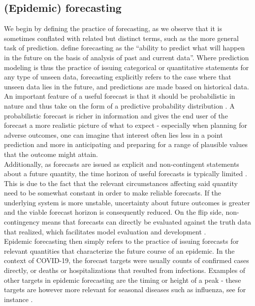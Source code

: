 \subsection{(Epidemic) forecasting} \label{sub:ep_forecasting}
We begin by defining the practice of forecasting, as we observe that it is sometimes conflated with related but distinct terms, such as the more general task of prediction. \cite{moran_epidemic_2016} define forecasting as the ``ability to predict what will happen in the future on the basis of analysis of past and current data''. Where prediction modeling is thus the practice of issuing categorical or quantitative statements for any type of unseen data, forecasting explicitly refers to the case where that unseen data lies in the future, and predictions are made based on historical data.\\
An important feature of a useful forecast is that it should be probabilistic in nature and thus take on the form of a predictive probability distribution \citep{gneiting_probabilistic_2007}. A probabilistic forecast is richer in information and gives the end user of the forecast a more realistic picture of what to expect - especially when planning for adverse outcomes, one can imagine that interest often lies less in a point prediction and more in anticipating and preparing for a range of plausible values that the outcome might attain.\\
Additionally, as forecasts are issued as explicit and non-contingent statements about a future quantity, the time horizon of useful forecasts is typically limited \citep{reich_collaborative_2022}. This is due to the fact that the relevant circumstances affecting said quantity need to be somewhat constant in order to make reliable forecasts. If the underlying system is more unstable, uncertainty about future outcomes is greater and the viable forecast horizon is consequently reduced. On the flip side, non-contingency means that forecasts can directly be evaluated against the truth data that realized, which facilitates model evaluation and development \citep{reich_collaborative_2022}. \medskip\\
Epidemic forecasting then simply refers to the practice of issuing forecasts for relevant quantities that characterize the future course of an epidemic. In the context of COVID-19, the forecast targets were usually counts of confirmed cases directly, or deaths or hospitalizations that resulted from infections. Examples of other targets in epidemic forecasting are the timing or height of a peak - these targets are however more relevant for seasonal diseases such as influenza, see for instance \cite{reich_collaborative_2019}.
